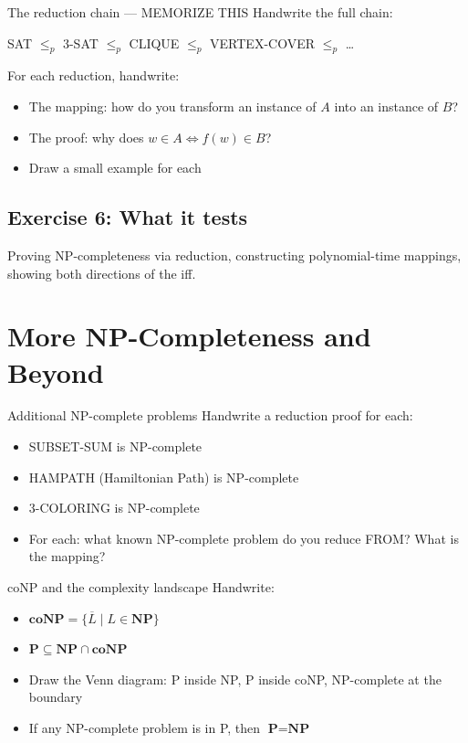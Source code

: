 \documentclass[11pt,a4paper]{article}
\begin{document}
\begin{writebox}{The reduction chain --- MEMORIZE THIS}
Handwrite the full chain:
\begin{center}
SAT $\leq_p$ 3-SAT $\leq_p$ CLIQUE $\leq_p$ VERTEX-COVER $\leq_p$ \ldots
\end{center}
For each reduction, handwrite:
\begin{itemize}[nosep]
\item The mapping: how do you transform an instance of $A$ into an instance of $B$?
\item The proof: why does $w \in A \iff f(w) \in B$?
\item Draw a small example for each
\end{itemize}
\end{writebox}

\subsection*{Exercise 6: What it tests}
Proving NP-completeness via reduction, constructing polynomial-time mappings, showing both directions of the iff.

\section{More NP-Completeness and Beyond}

\begin{writebox}{Additional NP-complete problems}
Handwrite a reduction proof for each:
\begin{itemize}[nosep]
\item SUBSET-SUM is NP-complete
\item HAMPATH (Hamiltonian Path) is NP-complete
\item 3-COLORING is NP-complete
\item For each: what known NP-complete problem do you reduce FROM? What is the mapping?
\end{itemize}
\end{writebox}

\begin{writebox}{coNP and the complexity landscape}
Handwrite:
\begin{itemize}[nosep]
\item $\textbf{coNP} = \{\overline{L} \mid L \in \textbf{NP}\}$
\item $\textbf{P} \subseteq \textbf{NP} \cap \textbf{coNP}$
\item Draw the Venn diagram: P inside NP, P inside coNP, NP-complete at the boundary
\item If any NP-complete problem is in P, then $\textbf{P} = \textbf{NP}$
\end{itemize}
\end{writebox}
\end{document}

